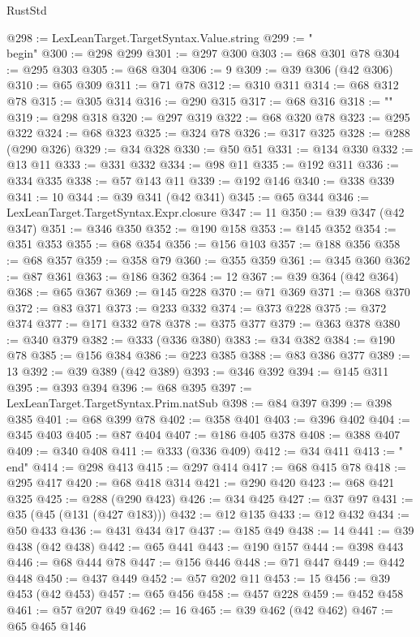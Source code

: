 \begin{lexlean}{RustStd}
\begin{coremodule}
{\begin{coremodule}
{{{{{{{{{{{{{{{{{{{{{{{{{{{{{{{{{@298 := LexLeanTarget.TargetSyntax.Value.string
@299 := "\\begin{"
@300 := @298 @299
@301 := @297 @300
@303 := @68 @301 @78
@304 := @295 @303
@305 := @68 @304
@306 := 9
@309 := @39 @306 (@42 @306)
@310 := @65 @309
@311 := @71 @78
@312 := @310 @311
@314 := @68 @312 @78
@315 := @305 @314
@316 := @290 @315
@317 := @68 @316
@318 := "}"
@319 := @298 @318
@320 := @297 @319
@322 := @68 @320 @78
@323 := @295 @322
@324 := @68 @323
@325 := @324 @78
@326 := @317 @325
@328 := @288 (@290 @326)
@329 := @34 @328
@330 := @50 @51
@331 := @134 @330
@332 := @13 @11
@333 := @331 @332
@334 := @98 @11
@335 := @192 @311
@336 := @334 @335
@338 := @57 @143 @11
@339 := @192 @146
@340 := @338 @339
@341 := 10
@344 := @39 @341 (@42 @341)
@345 := @65 @344
@346 := LexLeanTarget.TargetSyntax.Expr.closure
@347 := 11
@350 := @39 @347 (@42 @347)
@351 := @346 @350
@352 := @190 @158
@353 := @145 @352
@354 := @351 @353
@355 := @68 @354
@356 := @156 @103
@357 := @188 @356
@358 := @68 @357
@359 := @358 @79
@360 := @355 @359
@361 := @345 @360
@362 := @87 @361
@363 := @186 @362
@364 := 12
@367 := @39 @364 (@42 @364)
@368 := @65 @367
@369 := @145 @228
@370 := @71 @369
@371 := @368 @370
@372 := @83 @371
@373 := @233 @332
@374 := @373 @228
@375 := @372 @374
@377 := @171 @332 @78
@378 := @375 @377
@379 := @363 @378
@380 := @340 @379
@382 := @333 (@336 @380)
@383 := @34 @382
@384 := @190 @78
@385 := @156 @384
@386 := @223 @385
@388 := @83 @386 @377
@389 := 13
@392 := @39 @389 (@42 @389)
@393 := @346 @392
@394 := @145 @311
@395 := @393 @394
@396 := @68 @395
@397 := LexLeanTarget.TargetSyntax.Prim.natSub
@398 := @84 @397
@399 := @398 @385
@401 := @68 @399 @78
@402 := @358 @401
@403 := @396 @402
@404 := @345 @403
@405 := @87 @404
@407 := @186 @405 @378
@408 := @388 @407
@409 := @340 @408
@411 := @333 (@336 @409)
@412 := @34 @411
@413 := "\\end{"
@414 := @298 @413
@415 := @297 @414
@417 := @68 @415 @78
@418 := @295 @417
@420 := @68 @418 @314
@421 := @290 @420
@423 := @68 @421 @325
@425 := @288 (@290 @423)
@426 := @34 @425
@427 := @37 @97
@431 := @35 (@45 (@131 (@427 @183)))
@432 := @12 @135
@433 := @12 @432
@434 := @50 @433
@436 := @431 @434 @17
@437 := @185 @49
@438 := 14
@441 := @39 @438 (@42 @438)
@442 := @65 @441
@443 := @190 @157
@444 := @398 @443
@446 := @68 @444 @78
@447 := @156 @446
@448 := @71 @447
@449 := @442 @448
@450 := @437 @449
@452 := @57 @202 @11
@453 := 15
@456 := @39 @453 (@42 @453)
@457 := @65 @456
@458 := @457 @228
@459 := @452 @458
@461 := @57 @207 @49
@462 := 16
@465 := @39 @462 (@42 @462)
@467 := @65 @465 @146
}}}}}}}}}}}}}}}}}}}}}}}}}}}}}}}}}}
\end{coremodule}}
\end{coremodule}
\end{lexlean}
